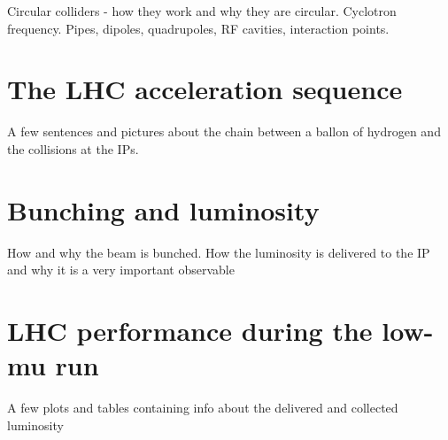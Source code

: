         Circular colliders - how they work and why they are circular. Cyclotron frequency.
Pipes, dipoles, quadrupoles, RF cavities, interaction points.

        \section{The LHC acceleration sequence}
        A few sentences and pictures about the chain between a ballon of hydrogen and the collisions at the IPs. 

        \section{Bunching and luminosity }
How and why the beam is bunched. How the luminosity is delivered to the IP and why it is a very important observable

        \section{LHC performance during the low-mu run}
A few plots and tables containing info about the delivered and collected luminosity
